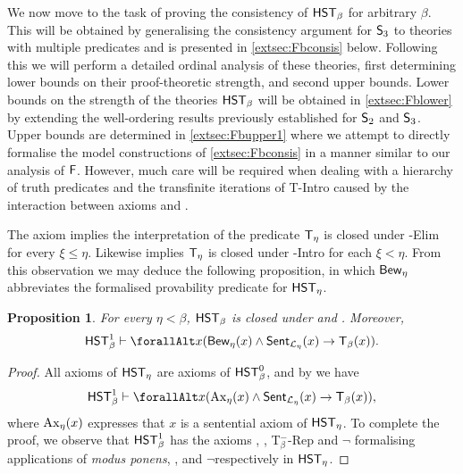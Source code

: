 \documentclass[UKenglish,cleveref,DIV=12]{scrartcl}
\let\forall\forallAlt
\newtheorem{proposition}[lemma]{Proposition}
\theoremstyle{definition}
\theoremstyle{definition}
\begin{document}
We now move to the task of proving the consistency of $\mathsf{HST}_\beta$ for arbitrary
$\beta$. This will be obtained by generalising the consistency argument for
$\mathsf{S}_3$ to theories with multiple predicates and is presented in
\cref{extsec:Fbconsis} below. Following this we will perform a detailed ordinal
analysis of these theories, first determining lower bounds on their
proof-theoretic strength, and second upper bounds. Lower bounds on the strength
of the theories $\mathsf{HST}_\beta$ will be obtained in \cref{extsec:Fblower} by
extending the well-ordering results previously established for $\mathsf{S}_2$ and
$\mathsf{S}_3$. Upper bounds are determined in \cref{extsec:Fbupper1} where we
attempt to directly formalise the model constructions of \cref{extsec:Fbconsis}
in a manner similar to our analysis of $\mathsf{F}$. However, much care will be required when
dealing with a hierarchy of truth predicates and the transfinite iterations of
T-Intro caused by the interaction between axioms \Uni\eta and \Rep\eta.

The axiom \Del\eta implies the interpretation of the predicate $\mathsf{T}_\eta$ is closed under \textT\xi-Elim for every $\xi\le\eta$. Likewise \Rep\eta implies $\mathsf{T}_\eta$ is closed under \textT\xi-Intro for each $\xi<\eta$. From this observation we may deduce the following proposition, in which $\mathsf{Bew}_\eta$ abbreviates the formalised provability predicate for $\mathsf{HST}_\eta$.
\begin{proposition}\label{extprop:FFreflec}
 For every $\eta<\beta$, $\mathsf{HST}_\beta$ is closed under \Nec\eta and \Conec\eta. Moreover, \[\HST_\beta^1\proves \forall x( \Prov_{\eta}(x)\land\Sent_{\L_\eta}(x)\rightarrow \T_\beta(x)).\]
\end{proposition}
\begin{proof}
All axioms of $\mathsf{HST}_\eta$ are axioms of $\mathsf{HST}_\beta^0$, and by \Nec\beta we have
\begin{align*}
  \HST_\beta^1\proves \forall x( \set{Ax}_{\eta}(x)\land\Sent_{\L_\eta}(x)\rightarrow \T_\beta(x)),
\end{align*}
where $\mathrm{Ax}_\eta(x)$ expresses that $x$ is a sentential axiom of $\mathsf{HST}_\eta$.
To complete the proof, we observe that $\mathsf{HST}_\beta^1$ has the axioms
\Imp\beta, \Del\beta, T$_\beta^-$-Rep and $\lnot$\Del\beta
formalising applications of {\em modus ponens}, \Conec\eta, \Nec\eta and $\lnot$\Conec\eta respectively in $\mathsf{HST}_\eta$.
\end{proof}
\end{document}
